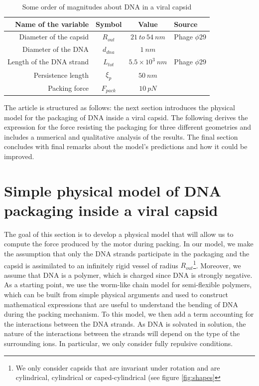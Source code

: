 \documentclass{article}
\begin{document}
\begin{table}[h]
    \centering
    \begin{tabular}{|| r | c | c | l ||}
        \hline \hline
        \textbf{Name of the variable} & \textbf{Symbol} & \textbf{Value} & \textbf{Source} \\
        \hline \hline
        Diameter of the capsid  & $R_{out}$   & $21~to~ 54~nm$ & Phage $\phi29$ \cite{tao1998}  \\
        Diameter of the DNA    & $ d_{dna}$  & $1~nm$           & \cite{phillips2005} \\
        Length of the DNA strand & $ L_{tot}$  & $5.5\times10^{3}~nm$  & Phage $\phi29$ \cite{tao1998} \\
        Persistence length       & $ \xi_p $   & $50~nm$           & \cite{smith2001} \\
        Packing force              & $ F_{pack}$  & $10~pN$          & \cite{phillips2005} \\
        \hline \hline
    \end{tabular}
    \caption{Some order of magnitudes about DNA in a viral capsid}
    \label{tab:figures}
\end{table}
The article is structured as follows: the next section introduces the physical model for the packaging of DNA inside a viral capsid. The following derives the expression for the force resisting the packaging for three different geometries and includes a numerical and qualitative analysis of the results. The final section concludes with final remarks about the model's predictions and how it could be improved.

\section{Simple physical model of DNA packaging inside a viral capsid}

The goal of this section is to develop a physical model that will allow us to compute the force produced by the motor during packing. 
In our model, we make the assumption that only the DNA strands participate in the packaging and the capsid is assimilated to an infinitely rigid vessel of radius $ R_{out}$\footnote{We only consider capsids that are invariant under rotation and are cylindrical, cylindrical or caped-cylindrical (see figure \ref{fig:shapes}}. Moreover, we assume that DNA is a polymer, which is charged since DNA is strongly negative. As a starting point, we use the worm-like chain model for semi-flexible polymers, which can be built from simple physical arguments and used to construct mathematical expressions that are useful to understand the bending of DNA during the packing mechanism. To this model, we then add a term accounting for the interactions between the DNA strands. As DNA is solvated in solution, the nature of the interactions between the strands will depend on the type of the surrounding ions. In particular, we only consider fully repulsive conditions.
\end{document}
